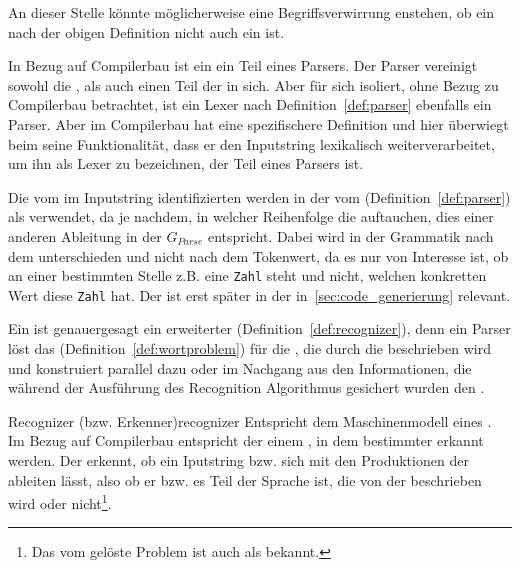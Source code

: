 \begin{Special_Paragraph}
  An dieser Stelle könnte möglicherweise eine Begriffsverwirrung enstehen, ob ein  nach der obigen Definition nicht auch ein  ist.

  In Bezug auf Compilerbau ist ein  ein Teil eines Parsers. Der Parser vereinigt sowohl die , als auch einen Teil der  in sich. Aber für sich isoliert, ohne Bezug zu Compilerbau betrachtet, ist ein Lexer nach Definition~\ref{def:parser} ebenfalls ein Parser. Aber im Compilerbau hat  eine spezifischere Definition und hier überwiegt beim  seine Funktionalität, dass er den Inputstring lexikalisch weiterverarbeitet, um ihn als Lexer zu bezeichnen, der Teil eines Parsers ist.
\end{Special_Paragraph}

Die vom  im Inputstring identifizierten  werden in der  vom  (Definition~\ref{def:parser}) als  verwendet, da je nachdem, in welcher Reihenfolge die  auftauchen, dies einer anderen Ableitung in der  $G_{Parse}$ entspricht. Dabei wird in der Grammatik nach dem  unterschieden und nicht nach dem Tokenwert, da es nur von Interesse ist, ob an einer bestimmten Stelle z.B. eine \verb|Zahl| steht und nicht, welchen konkretten Wert diese \verb|Zahl| hat. Der  ist erst später in der  in~\ref{sec:code_generierung} relevant.

Ein  ist genauergesagt ein erweiterter  (Definition~\ref{def:recognizer}), denn ein Parser löst das  (Definition~\ref{def:wortproblem}) für die , die durch die  beschrieben wird und konstruiert parallel dazu oder im Nachgang aus den Informationen, die während der Ausführung des Recognition Algorithmus gesichert wurden den .

\begin{Definition}{Recognizer (bzw. Erkenner)}{recognizer}
  Entspricht dem Maschinenmodell eines . Im Bezug auf Compilerbau entspricht der  einem , in dem  bestimmter  erkannt werden. Der  erkennt, ob ein Iputstring bzw.  sich mit den Produktionen der  ableiten lässt, also ob er bzw. es Teil der Sprache ist, die von der  beschrieben wird oder nicht\footnote{Das vom  gelöste Problem ist auch als  bekannt.}.
\end{Definition}


